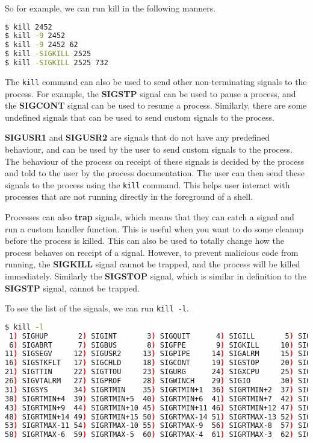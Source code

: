 So for example, we can run kill in the following manners.

\begin{lstlisting}[language=bash]
$ kill 2452
$ kill -9 2452
$ kill -9 2452 62
$ kill -SIGKILL 2525
$ kill -SIGKILL 2525 732
\end{lstlisting}

The \lstinline|kill| command can also be used to send other non-terminating signals
to the process. For example, the \textbf{SIGSTP} signal can be used to pause
a process, and the \textbf{SIGCONT} signal can be used to resume a process.
Similarly, there are some undefined signals that can be used to send custom
signals to the process.

\textbf{SIGUSR1} and \textbf{SIGUSR2} are signals that do not have any predefined
behaviour, and can be used by the user to send custom signals to the process.
The behaviour of the process on receipt of these signals is decided by the
process and told to the user by the process documentation. The user can
then send these signals to the process using the \lstinline|kill| command.
This helps user interact with processes that are not running directly in the
foreground of a shell.

Processes can also \textbf{trap} signals, which means that they can catch
a signal and run a custom handler function. This is useful when you want
to do some cleanup before the process is killed. This can also be used
to totally change how the process behaves on receipt of a signal.
However, to prevent malicious code from running, the \textbf{SIGKILL} signal
cannot be trapped, and the process will be killed immediately. Similarly
the \textbf{SIGSTOP} signal, which is similar in definition to the \textbf{SIGSTP}
signal, cannot be trapped.

To see the list of the signals, we can run \lstinline|kill -l|.

\begin{lstlisting}[language=bash]
$ kill -l
 1) SIGHUP       2) SIGINT       3) SIGQUIT      4) SIGILL       5) SIGTRAP
 6) SIGABRT      7) SIGBUS       8) SIGFPE       9) SIGKILL     10) SIGUSR1
11) SIGSEGV     12) SIGUSR2     13) SIGPIPE     14) SIGALRM     15) SIGTERM
16) SIGSTKFLT   17) SIGCHLD     18) SIGCONT     19) SIGSTOP     20) SIGTSTP
21) SIGTTIN     22) SIGTTOU     23) SIGURG      24) SIGXCPU     25) SIGXFSZ
26) SIGVTALRM   27) SIGPROF     28) SIGWINCH    29) SIGIO       30) SIGPWR
31) SIGSYS      34) SIGRTMIN    35) SIGRTMIN+1  36) SIGRTMIN+2  37) SIGRTMIN+3
38) SIGRTMIN+4  39) SIGRTMIN+5  40) SIGRTMIN+6  41) SIGRTMIN+7  42) SIGRTMIN+8
43) SIGRTMIN+9  44) SIGRTMIN+10 45) SIGRTMIN+11 46) SIGRTMIN+12 47) SIGRTMIN+13
48) SIGRTMIN+14 49) SIGRTMIN+15 50) SIGRTMAX-14 51) SIGRTMAX-13 52) SIGRTMAX-12
53) SIGRTMAX-11 54) SIGRTMAX-10 55) SIGRTMAX-9  56) SIGRTMAX-8  57) SIGRTMAX-7
58) SIGRTMAX-6  59) SIGRTMAX-5  60) SIGRTMAX-4  61) SIGRTMAX-3  62) SIGRTMAX-2
\end{lstlisting}

